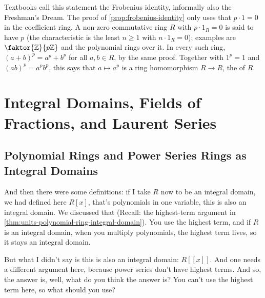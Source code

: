 \begin{aiNote}
Textbooks call this statement the Frobenius identity, informally also the Freshman's Dream. The proof of \cref{prop:frobenius-identity} only uses that $p \cdot 1 = 0$ in the coefficient ring. A non-zero commutative ring $R$ with $p \cdot 1_R = 0$ is said to have  $p$ (the characteristic is the least $n \ge 1$ with $n \cdot 1_R = 0$); examples are $\faktor{\mathbb{Z}}{p\mathbb{Z}}$ and the polynomial rings over it. In every such ring, $(a + b)^p = a^p + b^p$ for all $a, b \in R$, by the same proof. Together with $1^p = 1$ and $(ab)^p = a^p b^p$, this says that $a \mapsto a^p$ is a ring homomorphism $R \to R$, the  of $R$.
\end{aiNote}

\begin{hidden}
\end{hidden}

\section{Integral Domains, Fields of Fractions, and Laurent Series}

\subsection{Polynomial Rings and Power Series Rings as Integral Domains}

\begin{speech}[00:05:44 - 00:06:39]
And then there were some definitions: if I take $R$ now to be an integral domain,  we had defined here $R[x]$, that's polynomials in one variable, this is also an integral domain.  We discussed that (Recall: the highest-term argument in \cref{thm:units-polynomial-ring-integral-domain}). You use the highest term, and if $R$ is an integral domain, when you multiply polynomials, the highest term lives, so it stays an integral domain. 

But what I didn't say is this is also an integral domain: $R[[x]]$.  And one needs a different argument here, because power series don't have highest terms. And so, the answer is, well, what do you think the answer is? You can't use the highest term here, so what should you use?
\end{speech}

